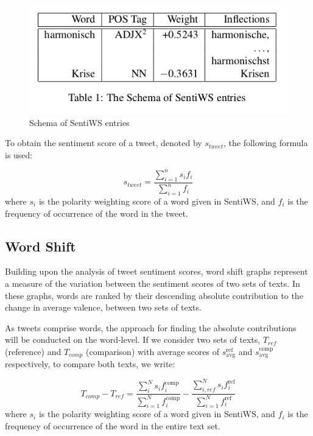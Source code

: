 \documentclass[10pt,twocolumn,twoside]{layout}
\begin{document}
\begin{figure} 
	\begin{center}
		\includegraphics[width=\linewidth]{figures/sentiws_example}
	\end{center}
	\caption{Schema of SentiWS entries}
	\label{fig:sentiws_example}
\end{figure}

To obtain the sentiment score of a tweet, denoted by \(s_{tweet}\), the following formula is used: 

\begin{equation}
\label{eq:word_score}
s_{tweet} = \frac{\sum_{i=1}^{n} s_i f_i}{\sum_{i=1}^{n} f_i}
\end{equation} 
where \(s_i\) is the polarity weighting score of a word given in SentiWS, and \(f_i\) is the frequency of occurrence of the word in the tweet. 

\subsection*{Word Shift}
Building upon the analysis of tweet sentiment scores, word shift graphs represent a measure of the variation between the sentiment scores of two sets of texts. In these graphs, words are ranked by their descending absolute contribution to the change in average valence, between two sets of texts. 

As tweets comprise words, the approach for finding the absolute contributions will be conducted on the word-level. If we consider two sets of texts, \(T_{ref}\) (reference) and \(T_{comp}\) (comparison) with average scores of \(s_{\text{avg}}^{\text{ref}}\) and \(s_{\text{avg}}^{\text{comp}}\) respectively, to compare both texts, we write: 

\begin{equation}
\label{eq:text_difference}
T_{comp} - T_{ref} = \frac{\sum_{i}^{N} s_i f_i^{\text{comp}}}{\sum_{i=1}^{N} f_i^{\text{comp}}} - \frac{\sum_{i,ref}^{N} s_i f_i^{\text{ref}}}{\sum_{i=1}^{N} f_i^{\text{ref}}}
\end{equation} 	
where \(s_i\) is the polarity weighting score of a word given in SentiWS, and \(f_i\) is the frequency of occurrence of the word in the entire text set. 
\end{document}
